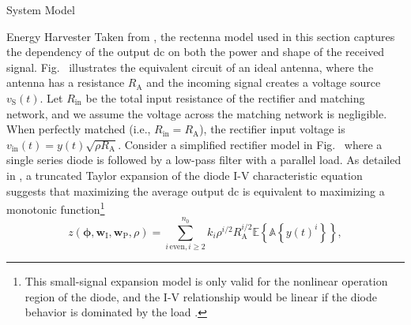 \begin{section}{System Model}
\begin{subsection}{Energy Harvester}
		Taken from \cite{Clerckx2016a}, the rectenna model used in this section captures the dependency of the output \gls{dc} on both the power and shape of the received signal. Fig.~ illustrates the equivalent circuit of an ideal antenna, where the antenna has a resistance $R_{\mathrm{A}}$ and the incoming signal creates a voltage source $v_{\mathrm{S}}(t)$. Let $R_{\mathrm{in}}$ be the total input resistance of the rectifier and matching network, and we assume the voltage across the matching network is negligible. When perfectly matched (i.e., $R_{\mathrm{in}}=R_{\mathrm{A}}$), the rectifier input voltage is $v_{\mathrm{in}}(t)=y(t)\sqrt{\rho R_{\mathrm{A}}}$. Consider a simplified rectifier model in Fig.~ where a single series diode is followed by a low-pass filter with a parallel load. As detailed in \cite{Clerckx2018b}, a truncated Taylor expansion of the diode I-V characteristic equation suggests that maximizing the average output \gls{dc} is equivalent to maximizing a monotonic function\footnote{This small-signal expansion model is only valid for the nonlinear operation region of the diode, and the I-V relationship would be linear if the diode behavior is dominated by the load \cite{Clerckx2016a}.}
		\begin{equation}\label{eq:z}
			z(\boldsymbol{\phi},\boldsymbol{w}_{\mathrm{I}},\boldsymbol{w}_{\mathrm{P}},\rho)=\sum_{i\,\mathrm{even},i\ge2}^{n_0}{k_i}{\rho^{i/2}}{R_{\mathrm{A}}^{i/2}}{\mathbb{E}\left\{\mathbb{A}\left\{y(t)^i\right\}\right\}},
		\end{equation}

\end{subsection}
\end{section}
